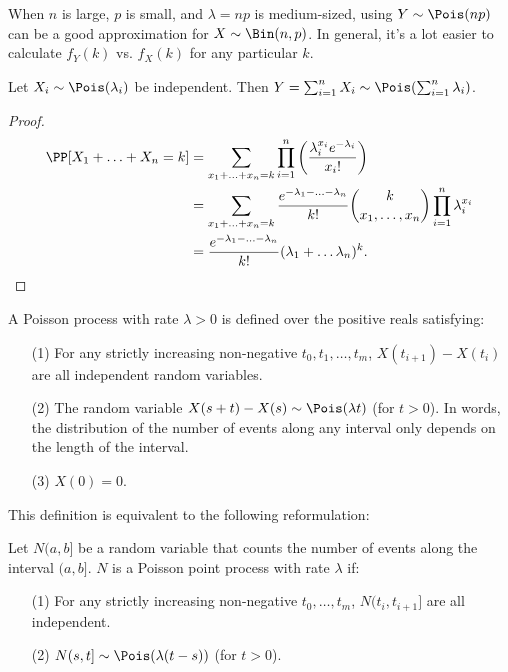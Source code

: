 \begin{example}

When $n$ is large, $p$ is small, and $\lambda = np$ is medium-sized, using $Y\sim \Pois(np)$ can be a good approximation for $X\sim \Bin(n,p)$. In general, it's a lot easier to calculate $f_Y(k)$ vs. $f_X(k)$ for any particular $k$.
\end{example}

\begin{theorem}
\lemlabel

Let $X_i\sim \Pois(\lambda_i)$ be independent. Then $Y = \sum_{i=1}^nX_i\sim \Pois(\sum_{i=1}^n\lambda_i)$. 
\end{theorem}

\begin{proof}
\begin{align*}
    \PP[X_1 + \hdots + X_n = k] &= \sum_{x_1 + \hdots + x_n = k}\prod_{i=1}^n\left(\frac{\lambda_i^{x_i}e^{-\lambda_i}}{x_i!}\right) \\ 
    &= \sum_{x_1+\hdots + x_n=k}\frac{e^{-\lambda_1 - \hdots - \lambda_n}}{k!}\binom{k}{x_1, \hdots, x_n}\prod_{i=1}^n \lambda_i^{x_i} \\
    &= \frac{e^{-\lambda_1 - \hdots - \lambda_n}}{k!}(\lambda_1+\hdots \lambda_n)^k.
\end{align*}
\end{proof}

\begin{definition}

A \ac{Poisson process} with rate $\lambda > 0$ is defined over the positive reals satisfying:
\begin{enumerate}
    \item [(1)] For any strictly increasing non-negative $t_0, t_1, \hdots, t_m$, $X(t_{i+1})-X(t_i)$ are all independent random variables. 
    \item [(2)] The random variable $X(s+t) - X(s) \sim \Pois(\lambda t)$ (for $t>0$). In words, the distribution of the number of events along any interval only depends on the length of the interval.
    \item [(3)] $X(0) = 0$.
\end{enumerate}
\end{definition}

This definition is equivalent to the following reformulation: 
\begin{definition}

Let $N(a,b]$ be a random variable that counts the number of events along the interval $(a,b]$. $N$ is a \ac{Poisson point process} with rate $\lambda$ if: 
\begin{enumerate}
    \item [(1)] For any strictly increasing non-negative $t_0, \hdots, t_m$, $N(t_i, t_{i+1}]$ are all independent.
    \item [(2)] $N(s,t]\sim \Pois(\lambda (t-s))$ (for $t>0$).
\end{enumerate}
\end{definition}

